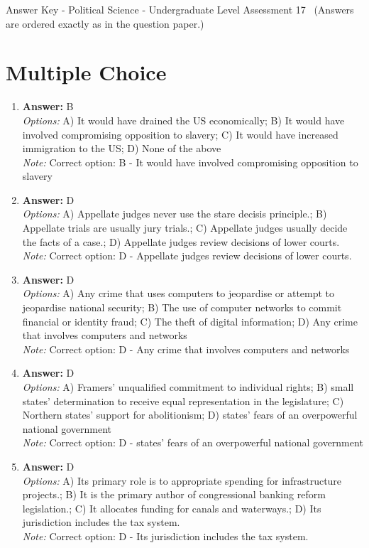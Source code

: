 \documentclass[12pt]{article}
\begin{document}
\begin{center}
Answer Key - Political Science - Undergraduate Level Assessment 17 \
\small (Answers are ordered exactly as in the question paper.)
\end{center}

\section*{Multiple Choice}
\begin{enumerate}[label=\arabic*.]
\item \textbf{Answer:} B
\\ \textit{Options:} A) It would have drained the US economically; B) It would have involved compromising opposition to slavery; C) It would have increased immigration to the US; D) None of the above
\\ \textit{Note:} Correct option: B - It would have involved compromising opposition to slavery
\item \textbf{Answer:} D
\\ \textit{Options:} A) Appellate judges never use the stare decisis principle.; B) Appellate trials are usually jury trials.; C) Appellate judges usually decide the facts of a case.; D) Appellate judges review decisions of lower courts.
\\ \textit{Note:} Correct option: D - Appellate judges review decisions of lower courts.
\item \textbf{Answer:} D
\\ \textit{Options:} A) Any crime that uses computers to jeopardise or attempt to jeopardise national security; B) The use of computer networks to commit financial or identity fraud; C) The theft of digital information; D) Any crime that involves computers and networks
\\ \textit{Note:} Correct option: D - Any crime that involves computers and networks
\item \textbf{Answer:} D
\\ \textit{Options:} A) Framers' unqualified commitment to individual rights; B) small states' determination to receive equal representation in the legislature; C) Northern states' support for abolitionism; D) states' fears of an overpowerful national government
\\ \textit{Note:} Correct option: D - states' fears of an overpowerful national government
\item \textbf{Answer:} D
\\ \textit{Options:} A) Its primary role is to appropriate spending for infrastructure projects.; B) It is the primary author of congressional banking reform legislation.; C) It allocates funding for canals and waterways.; D) Its jurisdiction includes the tax system.
\\ \textit{Note:} Correct option: D - Its jurisdiction includes the tax system.
\end{enumerate}
\end{document}
